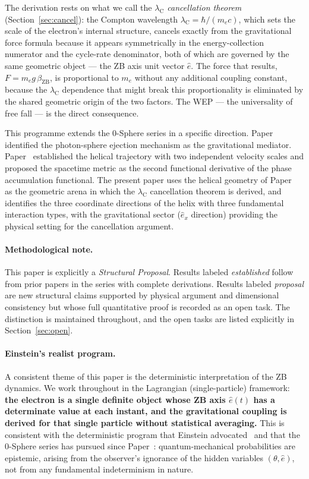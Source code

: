 \documentclass[%
 reprint, amsmath,amssymb, aps, prb, ]{revtex4-2}
\numberwithin{equation}{section}
\newcommand{\iphase}{\theta}
\newcommand{\lambdaC}{\lambda_{\mathrm{C}}}
\newcommand{\betaZB}{\beta_{\mathrm{ZB}}}
\newcommand{\ehat}[1]{\hat{e}_{#1}}
\begin{document}
The derivation rests on what we call the \emph{$\lambdaC$ cancellation theorem} (Section~\ref{sec:cancel}): the Compton wavelength $\lambdaC = \hbar/(m_e c)$, which sets the scale of the electron's internal structure, cancels exactly from the gravitational force formula because it appears symmetrically in the energy-collection numerator and the cycle-rate denominator, both of which are governed by the same geometric object --- the ZB axis unit vector $\hat{e}$.
The force that results, $F = m_e g\,\betaZB$, is proportional to $m_e$ without any additional coupling constant, because the $\lambdaC$ dependence that might break this proportionality is eliminated by the shared geometric origin of the two factors.
The WEP --- the universality of free fall --- is the direct consequence.

This programme extends the 0-Sphere series in a specific direction.
Paper~\cite{hanamura49} identified the photon-sphere ejection mechanism as the gravitational mediator.
Paper~\cite{hanamura51} established the helical trajectory with two independent velocity scales and proposed the spacetime metric as the second functional derivative of the phase accumulation functional.
The present paper uses the helical geometry of Paper~\cite{hanamura51} as the geometric arena in which the $\lambdaC$ cancellation theorem is derived, and identifies the three coordinate directions of the helix with three fundamental interaction types, with the gravitational sector ($\ehat{x}$ direction) providing the physical setting for the cancellation argument.

\paragraph{Methodological note.}
This paper is explicitly a \emph{Structural Proposal}.
Results labeled \emph{established} follow from prior papers in the series with complete derivations.
Results labeled \emph{proposal} are new structural claims supported by physical argument and dimensional consistency but whose full quantitative proof is recorded as an open task.
The distinction is maintained throughout, and the open tasks are listed explicitly in Section~\ref{sec:open}.

\paragraph{Einstein's realist program.}
A consistent theme of this paper is the deterministic interpretation of the ZB dynamics.
We work throughout in the Lagrangian (single-particle) framework: \textbf{the electron is a single definite object whose ZB axis $\hat{e}(t)$ has a determinate value at each instant, and the gravitational coupling is derived for that single particle without statistical averaging.}
This is consistent with the deterministic program that Einstein advocated~\cite{einstein1935} and that the 0-Sphere series has pursued since Paper~\cite{hanamura05}: quantum-mechanical probabilities are epistemic, arising from the observer's ignorance of the hidden variables $(\iphase, \hat{e})$, not from any fundamental indeterminism in nature.
\end{document}
